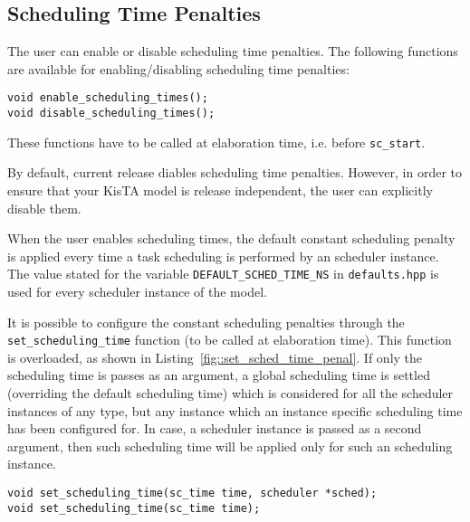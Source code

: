 
\subsection{Scheduling Time Penalties}
\label{sec:scheduling_time_penalties}

The user can enable or disable scheduling time penalties.
%
The following functions are available for enabling/disabling scheduling time penalties:

\begin{lstlisting}[style=KistaCodeStyle,caption={API for enabling/disabling scheduling time penalties.},label=fig::sched_time_penal]
void enable_scheduling_times();  
void disable_scheduling_times();
\end{lstlisting}
These functions have to be called at elaboration time, i.e. before \texttt{sc\_start}.

By default, current release diables scheduling time penalties.
%
However, in order to ensure that your KisTA model is release independent, the user can explicitly disable them. 

When the user enables scheduling times, the default constant scheduling penalty is applied
every time a task scheduling is performed by an scheduler instance.
%
The value stated for the variable \texttt{DEFAULT\_SCHED\_TIME\_NS} in \texttt{defaults.hpp} is used for
every scheduler instance of the model.

It is possible to configure the constant scheduling penalties through the \texttt{set\_scheduling\_time} function
(to be called at elaboration time).
%
This function is overloaded, as shown in Listing~\ref{fig::set_sched_time_penal}.
If only the scheduling time is passes as an argument, a global scheduling time is settled (overriding the default scheduling time)
which is considered for all the scheduler instances of any type, but any instance which an instance specific scheduling time has
been configured for.
%
In case, a scheduler instance is passed as a second argument, then such scheduling time will be applied only for such an 
scheduling instance.

\begin{lstlisting}[style=KistaCodeStyle,caption={API for setting user specific constant scheduling times.},label=fig::set_sched_time_penal]
void set_scheduling_time(sc_time time, scheduler *sched);
void set_scheduling_time(sc_time time);
\end{lstlisting}

